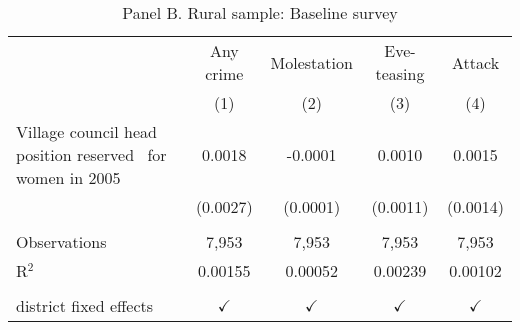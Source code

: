 \begin{table}[htbp]
   \caption{Panel B. Rural sample: Baseline survey}
   \bigskip
   \centering
   \begin{tabular}{lcccc}
      \toprule
                                                                   & Any crime     & Molestation   & Eve-teasing   & Attack\\  
                                                                   & (1)           & (2)           & (3)           & (4)\\  
      \midrule 
       Village council head position reserved \ for women in 2005  & 0.0018        & -0.0001       & 0.0010        & 0.0015\\   
                                                                   & (0.0027)      & (0.0001)      & (0.0011)      & (0.0014)\\   
       \\
      Observations                                                 & 7,953         & 7,953         & 7,953         & 7,953\\  
      R$^2$                                                        & 0.00155       & 0.00052       & 0.00239       & 0.00102\\  
       \\
      district fixed effects                                       & $\checkmark$  & $\checkmark$  & $\checkmark$  & $\checkmark$\\   
      \bottomrule
   \end{tabular}
\end{table}




